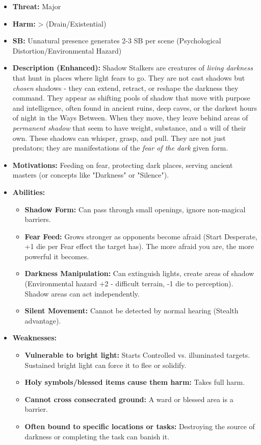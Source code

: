 \documentclass[11pt]{article}
\begin{document}
\begin{itemize}
\item \textbf{Threat:} Major
\item \textbf{Harm:} > (Drain/Existential)
\item \textbf{SB:} Unnatural presence generates 2-3 SB per scene (Psychological Distortion/Environmental Hazard)
\item \textbf{Description (Enhanced):} Shadow Stalkers are creatures of \textit{living darkness} that hunt in places where light fears to go. They are not cast shadows but \textit{chosen} shadows - they can extend, retract, or reshape the darkness they command. They appear as shifting pools of shadow that move with purpose and intelligence, often found in ancient ruins, deep caves, or the darkest hours of night in the Ways Between. When they move, they leave behind areas of \textit{permanent shadow} that seem to have weight, substance, and a will of their own. These shadows can whisper, grasp, and pull. They are not just predators; they are manifestations of the \textit{fear of the dark} given form.
\item \textbf{Motivations:} Feeding on fear, protecting dark places, serving ancient masters (or concepts like "Darkness" or "Silence").
\item \textbf{Abilities:}
\begin{itemize}
\item \textbf{Shadow Form:} Can pass through small openings, ignore non-magical barriers.
\item \textbf{Fear Feed:} Grows stronger as opponents become afraid (Start Desperate, +1 die per Fear effect the target has). The more afraid you are, the more powerful it becomes.
\item \textbf{Darkness Manipulation:} Can extinguish lights, create areas of shadow (Environmental hazard +2 - difficult terrain, -1 die to perception). Shadow areas can act independently.
\item \textbf{Silent Movement:} Cannot be detected by normal hearing (Stealth advantage).
\end{itemize}
\item \textbf{Weaknesses:}
\begin{itemize}
\item \textbf{Vulnerable to bright light:} Starts Controlled vs. illuminated targets. Sustained bright light can force it to flee or solidify.
\item \textbf{Holy symbols/blessed items cause them harm:} Takes full harm.
\item \textbf{Cannot cross consecrated ground:} A ward or blessed area is a barrier.
\item \textbf{Often bound to specific locations or tasks:} Destroying the source of darkness or completing the task can banish it.
\end{itemize}
\end{itemize}
\end{document}
